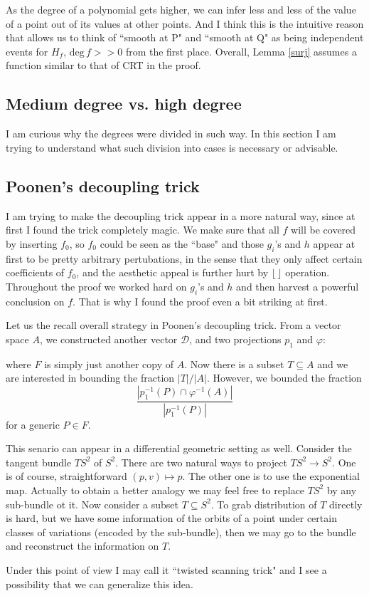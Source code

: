 \documentclass[12pt]{article}
\theoremstyle{plain}
\theoremstyle{definition}
\newcommand{\sD}{\mathcal{D}}
\renewcommand{\deg}{\mathrm{deg}\,}
\newcommand{\<}{\langle}
\renewcommand{\>}{\rangle}
\begin{document}
As the degree of a polynomial gets higher, we can infer less and less of the value of a point out of its values at other points. And I think this is the intuitive reason that allows us to think of ``smooth at P" and ``smooth at Q" as being independent events for $H_f$, $\deg f >> 0$ from the first place. Overall, Lemma \ref{surj} assumes a function similar to that of CRT in the proof. 
 

\subsection{Medium degree vs. high degree}
I am curious why the degrees were divided in such way. In this section I am trying to understand what such division into cases is necessary or advisable. 
\subsection{Poonen's decoupling trick}
I am trying to make the decoupling trick appear in a more natural way, since at first I found the trick completely magic. We make sure that all $f$ will be covered by inserting $f_0$, so $f_0$ could be seen as the ``base" and those $g_i$'s and $h$ appear at first to be pretty arbitrary pertubations, in the sense that they only affect certain coefficients of $f_0$, and the aesthetic appeal is further hurt by $\lfloor \, \rfloor$ operation. Throughout the proof we worked hard on $g_i$'s and $h$ and then harvest a powerful conclusion on $f$. That is why I found the proof even a bit striking at first.  

Let us the recall overall strategy in Poonen's decoupling trick. From a vector space $A$, we constructed another vector $\sD$, and two projections $p_1$ and $\varphi$:
\begin{center}
\end{center}
where $F$ is simply just another copy of $A$. Now there is a subset $T \subseteq A$ and we are interested in bounding the fraction $|T|/|A|$. However, we bounded the fraction 
$$ \frac{|p_1^{-1}(P) \cap \varphi^{-1}(A)|}{|p_1^{-1}(P)|}$$
for a generic $P \in F$. 
\par This senario can appear in a differential geometric setting as well. Consider the tangent bundle $TS^2$ of $S^2$. There are two natural ways to project $TS^2 \to S^2$. One is of course, straightforward $(p, v) \mapsto p$. The other one is to use the exponential map. Actually to obtain a better analogy we may feel free to replace $TS^2$ by any sub-bundle ot it. Now consider a subset $T \subseteq S^2$. To grab distribution of $T$ directly is hard, but we have some information of the orbits of a point under certain classes of variations (encoded by the sub-bundle), then we may go to the bundle and reconstruct the information on $T$. 
\par Under this point of view I may call it ``twisted scanning trick" and I see a possibility that we can generalize this idea. 
\end{document}
